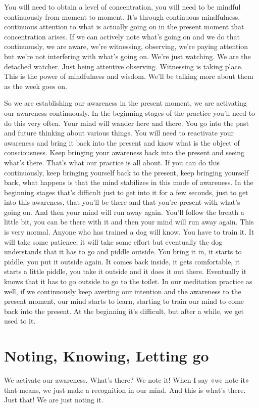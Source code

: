 \documentclass[letterpaper,10pt,english]{sphinxmanual}
\begin{document}
\sphinxAtStartPar
You will need to obtain a level of concentration, you will need to be
mindful  continuously  from  moment  to  moment.  It’s  through  continuous
mindfulness, continuous attention to what is actually going on in the present moment that concentration arises. If we can actively note what’s going
on and we do that continuously, we are aware, we’re witnessing, observing,
we’re paying attention but we’re not interfering with what’s going on. We’re
just watching. We are the detached watcher. Just being attentive observing.
Witnessing is taking place. This is the power of mindfulness and wisdom.
  We’ll be talking more about them as the week goes on.

\sphinxAtStartPar
So we are establishing our awareness in the present moment, we are
activating our awareness continuously. In the beginning stages of the practice you’ll need to do this very often. Your mind will wander here and there.
You go into the past and future thinking about various things. You will need
to  reactivate  your  awareness  and  bring  it  back  into  the  present  and  know
what is the object of consciousness. Keep bringing your awareness back into
the present and seeing what’s there. That’s what our practice is all about. If
you  can  do  this  continuously,  keep  bringing  yourself  back  to  the  present,
keep bringing yourself back, what happens is that the mind stabilizes in this
mode of awareness. In the beginning stages that’s difficult just to get into it
for a few seconds, just to get into this awareness, that you’ll be there and
that you’re present with what’s going on. And then your mind will run away
again. You’ll follow the breath a little bit, you can be there with it and then
your mind will run away again. This is very normal. Anyone who has trained
a dog will know. You have to train it. It will take some patience, it will take
some effort but eventually the dog understands that it has to go and piddle
outside. You bring it in, it starts to piddle, you put it outside again. It comes
back inside, it gets comfortable, it starts a little piddle, you take it outside
and it does it out there. Eventually it knows that it has to go outside to go to
the toilet. In our meditation practice as well, if we continuously keep averting our intention and the awareness to the present moment, our mind starts to
learn, starting to train our mind to come back into the present. At the beginning it’s difficult, but after a while, we get used to it.


\section{Noting, Knowing, Letting go}
\label{\detokenize{1-a:noting-knowing-letting-go}}
\sphinxAtStartPar
We activate our awareness. What’s there? We note it! When I say «we
note  it»  that  means,  we  just  make  a  recognition  in  our  mind. And  this  is
what’s there. Just that! We are just noting it.
\end{document}
